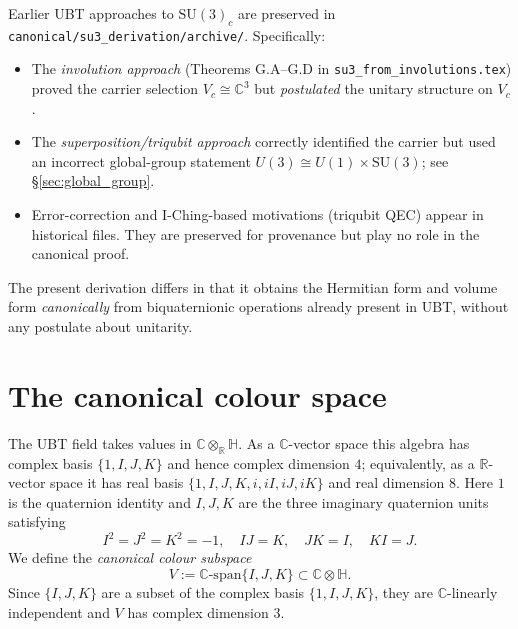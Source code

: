 \documentclass[12pt,a4paper]{article}
\theoremstyle{definition}
\theoremstyle{remark}
\begin{document}
Earlier UBT approaches to $\mathrm{SU}(3)_c$ are preserved in
\texttt{canonical/su3\_derivation/archive/}.  Specifically:
\begin{itemize}
  \item The \emph{involution approach} (Theorems G.A--G.D in
        \texttt{su3\_from\_involutions.tex}) proved the carrier selection
        $V_c\cong\mathbb{C}^3$ but \emph{postulated} the unitary structure on $V_c$.
  \item The \emph{superposition/triqubit approach} correctly identified the carrier
        but used an incorrect global-group statement
        $U(3)\cong U(1)\times\mathrm{SU}(3)$; see \S\ref{sec:global_group}.
  \item Error-correction and I-Ching-based motivations (triqubit QEC) appear in
        historical files.  They are preserved for provenance but play no role
        in the canonical proof.
\end{itemize}

The present derivation differs in that it obtains the Hermitian form and volume
form \emph{canonically} from biquaternionic operations already present in UBT,
without any postulate about unitarity.

\section{The canonical colour space}
\label{sec:colour_space}

The UBT field takes values in $\mathbb{C}\otimes_{\mathbb{R}}\mathbb{H}$.
As a $\mathbb{C}$-vector space this algebra has complex basis
$\{1,I,J,K\}$ and hence complex dimension $4$; equivalently, as a
$\mathbb{R}$-vector space it has real basis
$\{1,I,J,K,i,iI,iJ,iK\}$ and real dimension $8$.  Here $1$ is the quaternion
identity and $I,J,K$ are the three imaginary quaternion units satisfying
\begin{equation}\label{eq:quat}
  I^2=J^2=K^2=-1,\quad IJ=K,\quad JK=I,\quad KI=J.
\end{equation}
We define the \emph{canonical colour subspace}
\begin{equation}\label{eq:V_def}
  V := \mathbb{C}\text{-span}\{I,J,K\} \subset \mathbb{C}\otimes\mathbb{H}.
\end{equation}
Since $\{I,J,K\}$ are a subset of the complex basis $\{1,I,J,K\}$,
they are $\mathbb{C}$-linearly independent and $V$ has complex dimension $3$.
\end{document}
